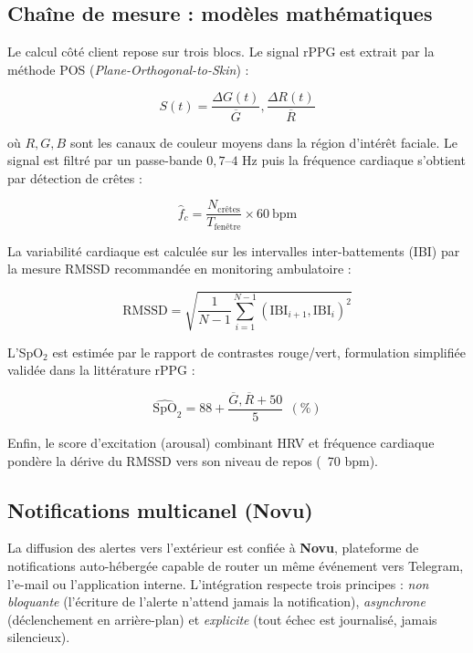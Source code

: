 \documentclass[11pt,a4paper]{article}
\begin{document}
\subsection{Chaîne de mesure : modèles mathématiques}
Le calcul côté client repose sur trois blocs. Le signal rPPG est extrait par la méthode POS
(\textit{Plane-Orthogonal-to-Skin}) \cite{pos2013} :

\begin{equation}
 S(t) = \frac{\Delta G(t)}{\overline{G}}, \frac{\Delta R(t)}{\overline{R}}
 \label{eq:pos}
\end{equation}

où $R, G, B$ sont les canaux de couleur moyens dans la région d'intérêt faciale. Le signal est filtré
par un passe-bande $0{,}7$--$4$ Hz puis la fréquence cardiaque s'obtient par détection de crêtes :

\begin{equation}
 \widehat{f}_c = \frac{N_{\text{crêtes}}}{T_{\text{fenêtre}}}\times 60\ \text{bpm}
 \label{eq:hr}
\end{equation}

La variabilité cardiaque est calculée sur les intervalles inter-battements (IBI) par la mesure RMSSD
recommandée en monitoring ambulatoire \cite{shaffer2017} :

\begin{equation}
 \text{RMSSD} = \sqrt{\frac{1}{N-1}\sum_{i=1}^{N-1}\left(\text{IBI}_{i+1}, \text{IBI}_{i}\right)^{2}}
 \label{eq:rmssd}
\end{equation}

L'SpO$_2$ est estimée par le rapport de contrastes rouge/vert, formulation simplifiée validée dans la
littérature rPPG \cite{spo2} :

\begin{equation}
 \widehat{\text{SpO}}_2 = 88 + \frac{\overline{G}, \overline{R} + 50}{5}\ \ (\%)
 \label{eq:spo2}
\end{equation}

Enfin, le score d'excitation (arousal) combinant HRV et fréquence cardiaque pondère la dérive du RMSSD
vers son niveau de repos (~70 bpm).

\subsection{Notifications multicanel (Novu)}
\label{sec:novu}
La diffusion des alertes vers l'extérieur est confiée à \textbf{Novu}, plateforme de notifications
auto-hébergée capable de router un même événement vers Telegram, l'e-mail ou l'application
interne. L'intégration respecte trois principes : \textit{non bloquante} (l'écriture de l'alerte
n'attend jamais la notification), \textit{asynchrone} (déclenchement en arrière-plan) et
\textit{explicite} (tout échec est journalisé, jamais silencieux).
\end{document}
